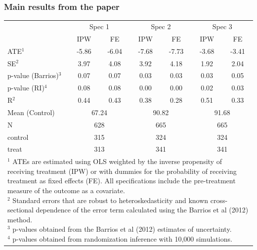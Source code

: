 \documentclass{beamer}
\begin{document}
\begin{frame}
\frametitle{Main results from the paper}


\begin{table}[ht]
\centering
{\footnotesize \begin{tabular}{lcccccc}
  \hline 
  & \multicolumn{2}{c}{Spec 1} &  \multicolumn{2}{c}{Spec 2} & \multicolumn{2}{c}{Spec 3} \\
 & IPW & FE & IPW & FE & IPW & FE \\ 
  \hline
ATE$^1$ & -5.86 & -6.04 & -7.68 & -7.73 & -3.68 & -3.41 \\ 
  SE$^2$ & 3.97 & 4.08 & 3.92 & 4.18 & 1.92 & 2.04 \\ 
  p-value (Barrios)$^3$ & 0.07 & 0.07 & 0.03 & 0.03 & 0.03 & 0.05 \\ 
  p-value (RI)$^4$ & 0.08 & 0.08 & 0.00 & 0.00 & 0.02 & 0.03 \\ 
  R$^2$ & 0.44 & 0.43 & 0.38 & 0.28 & 0.51 & 0.33 \\ 
  \hline
    Mean (Control) & \multicolumn{2}{c}{67.24} &  \multicolumn{2}{c}{90.82} &  \multicolumn{2}{c}{91.68} \\ 
  N & \multicolumn{2}{c}{628} &  \multicolumn{2}{c}{665} & \multicolumn{2}{c}{665} \\ 
  control & \multicolumn{2}{c}{315} & \multicolumn{2}{c}{324} & \multicolumn{2}{c}{324} \\ 
  treat & \multicolumn{2}{c}{313} & \multicolumn{2}{c}{341} & \multicolumn{2}{c}{341} \\ 
   \hline
   \multicolumn{7}{l}{\parbox{.9\textwidth}{{\tiny  $^1$ ATEs are estimated using OLS weighted by the inverse propensity of receiving treatment (IPW) or with dummies for the probability of receiving treatment as fixed effects (FE). All specifications include the pre-treatment measure of the outcome as a covariate. \\
   $^2$ Standard errors that are robust to heteroskedasticity and known cross-sectional dependence of the error term calculated using the Barrios et al (2012) method. \\
   $^3$ p-values obtained from the Barrios et al (2012) estimates of uncertainty.  \\
   $^4$ p-values obtained from randomization inference with 10,000 simulations. }}} \\
\end{tabular}}
\end{table}


\end{frame}
\end{document}

